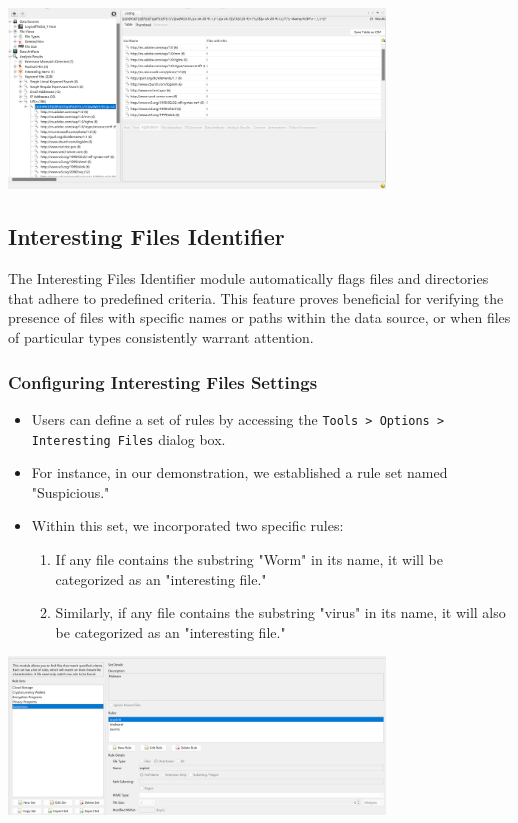 \documentclass{extarticle}
\begin{document}
\begin{center}
    \includegraphics[width=0.75\textwidth]{3/3.7/Keyword Search Results Details.png}
\end{center}

\subsection{Interesting Files Identifier}
The Interesting Files Identifier module automatically flags files and directories that adhere to predefined criteria. This feature proves beneficial for verifying the presence of files with specific names or paths within the data source, or when files of particular types consistently warrant attention.

\subsubsection*{Configuring Interesting Files Settings}
\begin{itemize}
    \item Users can define a set of rules by accessing the \texttt{Tools > Options > Interesting Files} dialog box.
    \item For instance, in our demonstration, we established a rule set named "Suspicious."
    \item Within this set, we incorporated two specific rules:
    \begin{enumerate}
        \item If any file contains the substring "Worm" in its name, it will be categorized as an "interesting file."
        \item Similarly, if any file contains the substring "virus" in its name, it will also be categorized as an "interesting file."
    \end{enumerate}
\end{itemize}

\begin{center}
    \includegraphics[width=0.75\textwidth]{3/3.8/Interesting Files Configuration.png}
\end{center}
\end{document}
